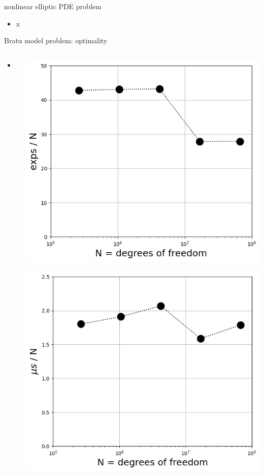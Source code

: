 \documentclass[svgnames,
               hyperref={colorlinks,citecolor=DeepPink4,linkcolor=FireBrick,urlcolor=Maroon},
               usepdftitle=false]  %
               {beamer}
\begin{document}
\begin{frame}{nonlinear elliptic PDE problem}

\begin{itemize}
\item x
\end{itemize}
\end{frame}


\begin{frame}{Bratu model problem: optimality}

\begin{columns}
\begin{column}{0.6\textwidth}
\begin{itemize}
\item x
\end{itemize}
\end{column}
\begin{column}{0.4\textwidth}
\includegraphics[width=\textwidth]{images/bratu-exps.png}

\includegraphics[width=\textwidth]{images/bratu-time.png}
\end{column}
\end{columns}
\end{frame}
\end{document}
